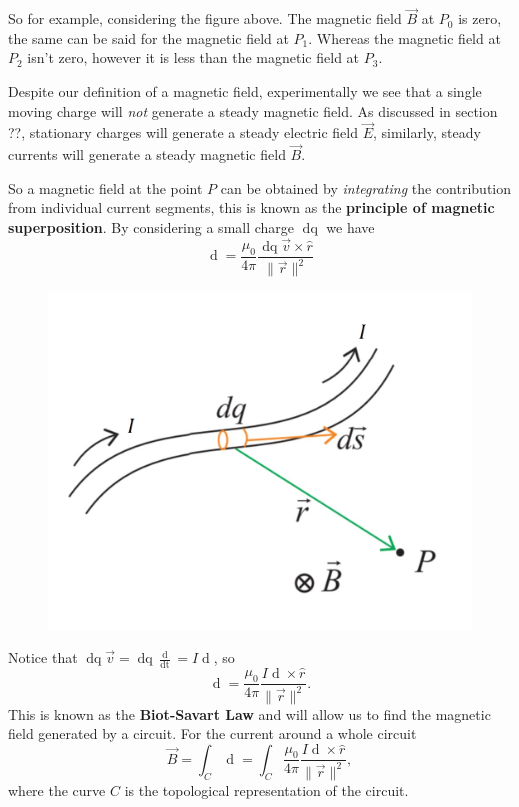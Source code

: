 So for example, considering the figure above. The magnetic field $\vec{B}$ at $P_0$ is zero, the same can be said for the magnetic field at $P_1$. Whereas the magnetic field at $P_2$ isn't zero, however it is less than the magnetic field at $P_3$. 

Despite our definition of a magnetic field, experimentally we see that a single moving charge will \textit{not} generate a steady magnetic field. As discussed in section ??, stationary charges will generate a steady electric field $\vec{E}$, similarly, steady currents will generate a steady magnetic field $\vec{B}$. 

So a magnetic field at the point $P$ can be obtained by \textit{integrating} the contribution from individual current segments, this is known as the \textbf{principle of magnetic superposition}. By considering a small charge $\mathop{\mathrm{d}q}$ we have 
\begin{equation}
    \mathop{\mathrm{d}\vec{B}} = \frac{\mu_0}{4\pi} \frac{\mathop{\mathrm{d}q} \vec{v} \times \hat{r}}{\| \vec{r} \|^2}
\end{equation}

\begin{figure}[h!]
    \centering
    \includegraphics[scale=0.4]{notes/images/Magnetic-Superposition-1.JPG}
\end{figure}
\FloatBarrier

Notice that $\mathop{\mathrm{d}q} \vec{v} = \mathop{\mathrm{d}q} \frac{\mathop{\mathrm{d}\vec{s}}}{\mathop{\mathrm{d}t}} = I \mathop{\mathrm{d}\vec{s}}$, so 
\begin{equation}
    \mathop{\mathrm{d}\vec{B}} = \frac{\mu_0}{4\pi} \frac{I \mathop{\mathrm{d}\vec{s}} \times \hat{r}}{\| \vec{r} \|^2}.
\end{equation}
This is known as the \textbf{Biot-Savart Law} and will allow us to find the magnetic field generated by a circuit. For the current around a whole circuit
\begin{equation}
    \vec{B} = \int_C \mathop{\mathrm{d}\vec{B}} = \int_C \frac{\mu_0}{4\pi} \frac{I \mathop{\mathrm{d}\vec{s}} \times \hat{r}}{\| \vec{r} \|^2},
\end{equation}
where the curve $C$ is the topological representation of the circuit. 



